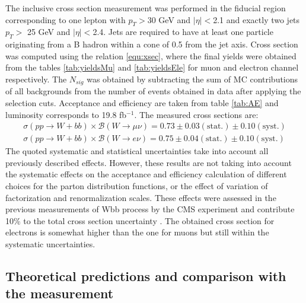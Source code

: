 The inclusive cross section measurement was performed in the fiducial region corresponding to one lepton with $p_T>$30 GeV and $|\eta|<$2.1 and exactly two jets $p_T>$ 25 GeV and $|\eta|<$2.4. Jets are required to have at least one particle originating from a B hadron within a cone of 0.5 from the jet axis. Cross section was computed using the relation \ref{equ:xsec}, where the final yields were obtained from the tables \ref{tab:yieldsMu} and \ref{tab:yieldsEle} for muon and electron channel respectively. The $N_{sig}$ was obtained by subtracting the sum of MC contributions of all backgrounds from the number of events obtained in data after applying the selection cuts.
Acceptance and efficiency are taken from table \ref{tab:AE} and luminosity corresponds to 19.8 fb$^{-1}$. The measured cross sections are:
\begin{align*}
\sigma(pp\rightarrow W+bb)\times \mathcal{B}(W\rightarrow \mu\nu) = 0.73 \pm 0.03(\mathrm{stat.}) \pm 0.10(\mathrm{syst.})\\
\sigma(pp\rightarrow W+bb)\times \mathcal{B}(W\rightarrow e\nu) = 0.75 \pm 0.04(\mathrm{stat.}) \pm 0.10(\mathrm{syst.})
\end{align*}
The quoted systematic and statistical uncertainties take into account all previously described effects. However, these results are not taking into account the systematic effects on the acceptance and efficiency calculation of different choices for the parton distribution functions, or the effect of variation of factorization and renormalization scales. These effects were assessed in the previous measurements of Wbb process by the CMS experiment and contribute 10\% to the total cross section uncertainty \cite{Chatrchyan:2013uza}. The obtained cross section for electrons is somewhat higher than the one for muons but still within the systematic uncertainties.   

\subsection{Theoretical predictions and comparison with the measurement}

